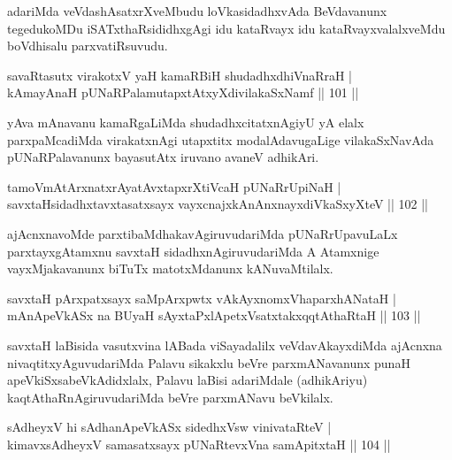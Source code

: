 \begin{artha}
adariMda veVdashAsatxrXveMbudu loVkasidadhxvAda BeVdavanunx tegedukoMDu iSATxthaRsididhxgAgi idu kataRvayx idu kataRvayxvalalxveMdu boVdhisalu parxvatiRsuvudu.
\end{artha}

\begin{shl}
savaRtasutx virakotxV yaH kamaRBiH shudadhxdhiVnaRraH  | \\
kAmayAnaH pUNaRPalamutapxtAtxyXdivilakaSxNamf \hfill||  101 ||  
\end{shl}

\begin{artha}
yAva mAnavanu kamaRgaLiMda shudadhxcitatxnAgiyU yA elalx parxpaMcadiMda virakatxnAgi utapxtitx modalAdavugaLige vilakaSxNavAda pUNaRPalavanunx bayasutAtx iruvano avaneV adhikAri.
\end{artha}

\begin{shl}
tamoVmAtArxnatxrAyatAvxtapxrXtiVcaH pUNaRrUpiNaH  | \\
savxtaHsidadhxtavxtasatxsayx vayxcnajxkAnAnxnayxdiVkaSxyXteV \hfill||  102 ||  
\end{shl}

\begin{artha}
ajAcnxnavoMde parxtibaMdhakavAgiruvudariMda pUNaRrUpavuLaLx parxtayxgAtamxnu savxtaH sidadhxnAgiruvudariMda A Atamxnige vayxMjakavanunx biTuTx matotxMdanunx kANuvaMtilalx.
\end{artha}

\begin{shl}
savxtaH pArxpatxsayx saMpArxpwtx vAkAyxnomxVhaparxhANataH  | \\
mAnApeVkASx na BUyaH sAyxtaPxlApetxVsatxtakxqqtAthaRtaH \hfill||  103 ||  
\end{shl}

\begin{artha}
savxtaH laBisida vasutxvina lABada viSayadalilx veVdavAkayxdiMda ajAcnxna nivaqtitxyAguvudariMda Palavu sikakxlu beVre parxmANavanunx punaH apeVkiSxsabeVkAdidxlalx, Palavu laBisi adariMdale (adhikAriyu) kaqtAthaRnAgiruvudariMda beVre parxmANavu beVkilalx.
\end{artha}

\begin{shl}
sAdheyxV hi sAdhanApeVkASx sidedhxV\s sw vinivataRteV  | \\
kimavxsAdheyxV samasatxsayx pUNaRtevxVna samApitxtaH \hfill||  104 ||  
\end{shl}

